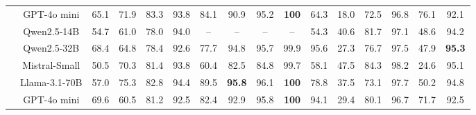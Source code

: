 \begin{table*}[tb]
{\begin{tabular}{@{}c|c|cccc|cccc|cccc|cc@{}}
                                     & GPT-4o mini 
                                     &  65.1 & 71.9 & 83.3 & 93.8 %
                                     &  84.1 & 90.9 & 95.2 & \textbf{100} %
                                     &  64.3 & 18.0 & 72.5 & 96.8 %
                                     &  76.1 & 92.1 \\ %

                                     
                                \cline{1-16}\rule{0pt}{10pt}
                                \multirow{5}{*}{Paraphrasing} 
                                     & Qwen2.5-14B 
                                     &  54.7 & 61.0 & 78.0 & 94.0 %
                                     &  -- & -- & -- & -- %
                                     & 54.3  & 40.6 & 81.7 & 97.1 %
                                     &  48.6 & 94.2\rule{0pt}{12pt} \\ %

                                     & Qwen2.5-32B 
                                     &  68.4 & 64.8 & 78.4 & 92.6 %
                                     &  77.7 & 94.8 & 95.7 & 99.9 %
                                     &  95.6 & 27.3 & 76.7 & 97.5 %
                                     &  47.9 & \textbf{95.3} \\ %

                                     & Mistral-Small 
                                     &  50.5 & 70.3 & 81.4 & 93.8 %
                                     &  60.4 & 82.5 & 84.8 & 99.7 %
                                     & 58.1  & 47.5 & 84.3 & 98.2 %
                                     &  24.6  & 95.1 \\ %

                                     & Llama-3.1-70B 
                                     &  57.0 & 75.3 & 82.8 & 94.4 %
                                     &  89.5 & \textbf{95.8} & 96.1 & \textbf{100} %
                                     & 78.8  & 37.5  & 73.1 & 97.7 %
                                     &  50.2 & 94.8 \\ %
                                     
                                     & GPT-4o mini 
                                     &  69.6 & 60.5 & 81.2 & 92.5 %
                                     &  82.4 & 92.9  & 95.8 & \textbf{100} %
                                     & 94.1  &  29.4 & 80.1 & 96.7 %
                                     &  71.7 & 92.5 \\ %


\end{tabular}}
\end{table*}
